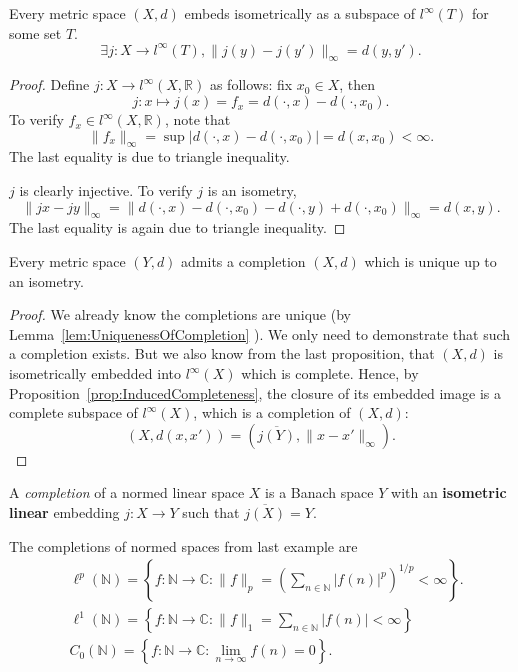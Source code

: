 \begin{proposition}
	\label{prop:EmbeddingMetricSpace}
	Every metric space $(X, d)$ embeds isometrically as a subspace of $l^{\infty }(T)$ for some set $T$.
	\[
		\exists  j: X \to  l^\infty (T), \|j(y) - j(y')\|_\infty  = d(y, y')
	.\] 
\end{proposition}
\begin{proof}
	Define $j: X \to  l^\infty (X, \mathbb{R})$ as follows: fix $x_0 \in X$, then 
	\[
		j: x \mapsto j(x) = f_x = d(\cdot , x) - d(\cdot , x_0) 
	.\] 
	To verify $f_x \in l^\infty (X, \mathbb{R})$, note that
	 \[
		\|f_x\|_{\infty } = \sup |d(\cdot , x) - d(\cdot , x_0)|  = d(x, x_0) < \infty 
	.\] 
	The last equality is due to triangle inequality.

	$j$ is clearly injective. To verify $j$ is an isometry,
	\[
		\|j x - j y\|_{\infty } = \|d(\cdot , x) - d(\cdot , x_0) - d(\cdot , y) + d(\cdot , x_0)\|_{\infty } = d(x, y)
	.\] 
	The last equality is again due to triangle inequality.
\end{proof}

\begin{corollary}
	Every metric space $(Y, d)$ admits a completion $(X, d)$ which is unique up to an isometry.
\end{corollary}
\begin{proof}
	We already know the completions are unique (by Lemma~\ref{lem:UniquenessOfCompletion} ). We only need to demonstrate that such a completion exists. But we also know from the last proposition, that $(X, d)$ is isometrically embedded into $l^\infty (X)$ which is complete. Hence, by Proposition~\ref{prop:InducedCompleteness}, the closure of its embedded image is a complete subspace of $l^\infty (X)$, which is a completion of $(X, d)$:
	\[
		(X, d(x, x')) = \left( \overline{j(Y)} , \|x - x'\|_\infty  \right) 
	.\] 
\end{proof}

\begin{definition}
	\label{defn:CompletionOfBanachSpace}
	
	A \textit{completion} of a normed linear space $X$ is a Banach space $Y $ with an \textbf{isometric} \textbf{linear} embedding $j: X \to  Y$ such that $\overline{j(X)}  = Y$.
\end{definition}

\begin{remark}
	The completions of normed spaces from last example are
\[
\begin{aligned}
& \ell^p(\mathbb{N})=\left\{f: \mathbb{N} \rightarrow \mathbb{C}:\|f\|_p=\left(\sum_{n \in \mathbb{N}}|f(n)|^p\right)^{1 / p}<\infty\right\} . \\
& \ell^1(\mathbb{N})=\left\{f: \mathbb{N} \rightarrow \mathbb{C}:\|f\|_1=\sum_{n \in \mathbb{N}}|f(n)|<\infty\right\} \\
& C_0(\mathbb{N})=\left\{f: \mathbb{N} \rightarrow \mathbb{C}: \lim _{n \rightarrow \infty} f(n)=0\right\} .
\end{aligned}
\]
\end{remark}

